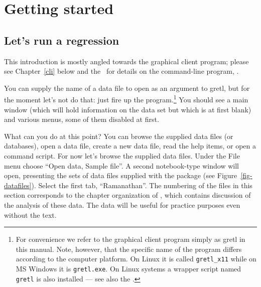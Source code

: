 \chapter{Getting started}
\label{getting-started}


\section{Let's run a regression}
\label{starting-regression}

This introduction is mostly angled towards the graphical client
program; please see Chapter~\ref{cli} below and the \GCR\ for details
on the command-line program, .
    
You can supply the name of a data file to open as an argument to
gretl, but for the moment let's not do that: just fire up the
program.\footnote{For convenience we refer to the graphical client
  program simply as gretl in this manual. Note, however, that
  the specific name of the program differs according to the computer
  platform.  On Linux it is called \verb+gretl_x11+ while on MS
  Windows it is \verb+gretl.exe+. On Linux systems a wrapper script
  named \verb+gretl+ is also installed --- see also the \GCR.}  You
should see a main window (which will hold information on the data set
but which is at first blank) and various menus, some of them disabled
at first.
    
What can you do at this point?  You can browse the supplied data files
(or databases), open a data file, create a new data file, read the
help items, or open a command script.  For now let's browse the
supplied data files.  Under the File menu choose ``Open data, Sample
file''.  A second notebook-type window will open, presenting the sets
of data files supplied with the package (see
Figure~\ref{fig-datafiles}).  Select the first tab, ``Ramanathan''.
The numbering of the files in this section corresponds to the chapter
organization of \cite{ramanathan02}, which contains discussion of the
analysis of these data. The data will be useful for practice purposes
even without the text.
    

